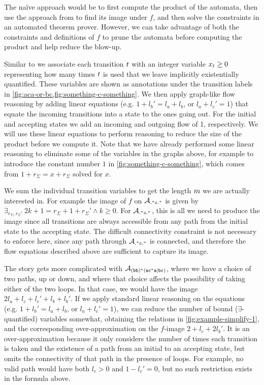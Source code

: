 \documentclass[acmsmall,review,anonymous,screen]{acmart}\settopmatter{printfolios=true,printccs=true,printacmref=true}
\theoremstyle{definition}
\begin{document}
The na\"ive approach would be to first compute the product of the automata, then
use the approach from \cite{generate-parikh-image} to find its image under $f$,
and then solve the constraints in an automated theorem prover. However, we can
take advantage of both the constraints and definitions of $f$ to prune the
automata before computing the product and help reduce the blow-up.

Similar to \cite{generate-parikh-image} we associate each transition
$t$ with an integer variable $x_t \geq 0$
representing how many times $t$ is used that we leave implicitly
existentially quantified. These variables are shown as annotations under the
transition labels in \cref{fig:aca-or-bc,fig:something-c-something}. We then
apply graph-like flow reasoning by adding linear equations (e.g. $1 + {l_b}' =
l_a + l_b$, or $l_a + l_c' = 1$) that equate the incoming transitions into a
state to the ones going out. For the initial and accepting states we add an
incoming and outgoing flow of 1, respectively. We will use these linear
equations to perform reasoning to reduce the size of the product before we
compute it. Note that we have already performed some linear reasoning to
eliminate some of the variables in the graphs above, for example to introduce
the constant number $1$ in \cref{fig:something-c-something}, which comes from $1
+ r_\Sigma = x + r_\Sigma$ solved for $x$.

We sum the individual transition variables to get the length $m$ we
are actually interested in. For example the image of $f$ on
$\mathcal{A}_{\mathtt{.^\ast{}c.^\ast}}$ is given by $\exists_{r_\Sigma, r_\Sigma'} \: 2k + 1 =
r_\Sigma + 1 + r_\Sigma' \land k \geq 0$. For $\mathcal{A}_{\mathtt{.^\ast{}c.^\ast}}{}$, this is
all we need to produce the image since all transitions are always accessible
from any path from the initial state to the accepting state. The difficult
connectivity constraint is not necessary to enforce here, since any path through
$\mathcal{A}_{\mathtt{.^\ast{}c.^\ast}}{}$ is connected, and therefore the flow equations
described above are sufficient to capture its image.

The story gets more complicated with $\mathcal{A}_{\mathtt{(bb)^\ast(ac^\ast{}a|bc)}}{}$, where we have a choice of two
paths, up or down, and where that choice affects the possibility of taking
either of the two loops. In that case, we would have the image $2l_a + l_c + l_c' + l_b + l_b'$.
If we apply standard linear reasoning on the equations (e.g. $1 + {l_b}' = l_a +
l_b$, or $l_a + l_c' = 1$), we can reduce the number of bound
($\exists$-quantified) variables somewhat, obtaining the relations in
\cref{fig:example-simplify-1}, and the corresponding over-approximation on
the $f$-image $2 + l_c + 2l_b'$. It is an over-approximation because it only
considers the number of times each transition is taken and the existence of a
path from an initial to an accepting state, but omits the connectivity of that
path in the presence of loops. For example, no valid path would have both $l_c >
0$ and $1 - l_c' = 0$, but no such restriction exists in the formula above.
\end{document}
